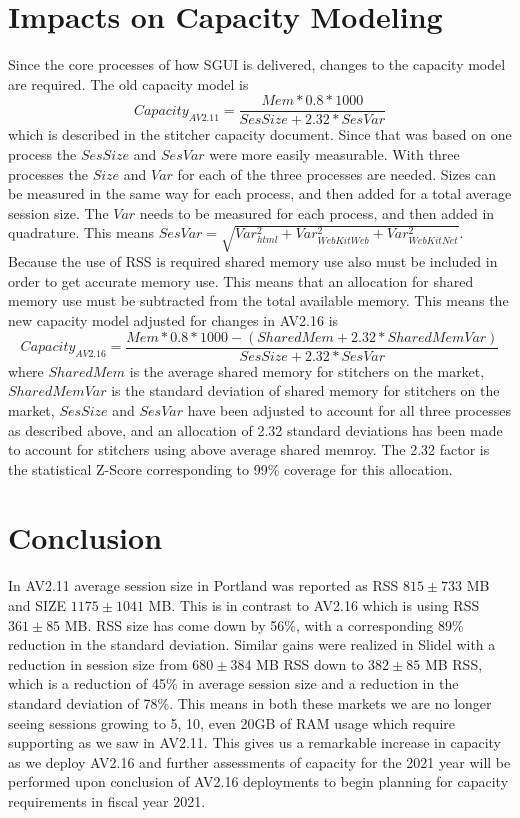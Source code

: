 \documentclass{article}
\begin{document}
\section{Impacts on Capacity Modeling}
\label{SECTION-CapacityModel}

Since the core processes of how SGUI is delivered, changes to the capacity model are required. The old capacity model is $$Capacity_{AV2.11}=\frac{Mem * 0.8 * 1000}{SesSize + 2.32*SesVar}$$ which is described in the stitcher capacity document. Since that was based on one process the $SesSize$ and $SesVar$ were more easily measurable. With three processes the $Size$ and $Var$ for each of the three processes are needed. Sizes can be measured in the same way for each process, and then added for a total average session size. The $Var$ needs to be measured for each process, and then added in quadrature. This means $SesVar=\sqrt{Var_{html}^2 + Var_{WebKitWeb}^2 + Var_{WebKitNet}^2}$. Because the use of RSS is required shared memory use also must be included in order to get accurate memory use. This means that an allocation for shared memory use must be subtracted from the total available memory. This means the new capacity model adjusted for changes in AV2.16 is $$Capacity_{AV2.16}=\frac{Mem * 0.8 * 1000 - (SharedMem + 2.32*SharedMemVar)}{SesSize + 2.32*SesVar}$$ where $SharedMem$ is the average shared memory for stitchers on the market, $SharedMemVar$ is the standard deviation of shared memory for stitchers on the market, $SesSize$ and $SesVar$ have been adjusted to account for all three processes as described above, and an allocation of 2.32 standard deviations has been made to account for stitchers using above average shared memroy. The 2.32 factor is the statistical Z-Score corresponding to 99\% coverage for this allocation.



\section{Conclusion}
\label{SECTION-Conclusion}

In AV2.11 average session size in Portland was reported as RSS $815 \pm 733$ MB and SIZE $1175 \pm 1041$ MB. This is in contrast to AV2.16 which is using RSS $361 \pm 85$ MB. RSS size has come down by 56\%, with a corresponding 89\% reduction in the standard deviation. Similar gains were realized in Slidel with a reduction in session size from $680 \pm 384$ MB RSS down to $382 \pm 85$ MB RSS, which is a reduction of 45\% in average session size and a reduction in the standard deviation of 78\%. This means in both these markets we are no longer seeing sessions growing to 5, 10, even 20GB of RAM usage which require supporting as we saw in AV2.11. This gives us a remarkable increase in capacity as we deploy AV2.16 and further assessments of capacity for the 2021 year will be performed upon conclusion of AV2.16 deployments to begin planning for capacity requirements in fiscal year 2021. 
\end{document}
